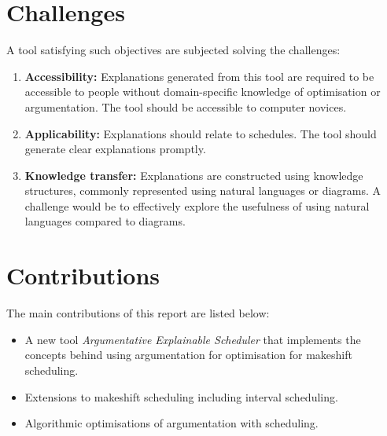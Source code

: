 \section{Challenges}

A tool satisfying such objectives are subjected solving the challenges:
\begin{enumerate}
	\item\textbf{Accessibility:} Explanations generated from this tool are required to be accessible to people without domain-specific knowledge of optimisation or argumentation. The tool should be accessible to computer novices.
	\item\textbf{Applicability:} Explanations should relate to schedules. The tool should generate clear explanations promptly.
	\item\textbf{Knowledge transfer:} Explanations are constructed using knowledge structures, commonly represented using natural languages or diagrams. A challenge would be to effectively explore the usefulness of using natural languages compared to diagrams.

\end{enumerate}

\section{Contributions}

The main contributions of this report are listed below:
\begin{itemize}
	\item A new tool \emph{Argumentative Explainable Scheduler} that implements the concepts behind using argumentation for optimisation for makeshift scheduling.
	\item Extensions to makeshift scheduling including interval scheduling.
	\item Algorithmic optimisations of argumentation with scheduling.
\end{itemize}